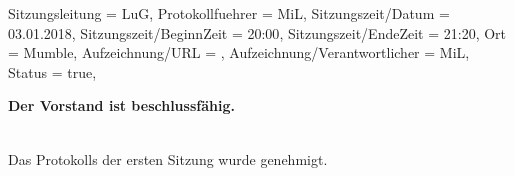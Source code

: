 
\begin{Protokoll}{
        Sitzungsleitung                 = {LuG},             %
        Protokollfuehrer                = {MiL},              %
        Sitzungszeit/Datum              = {03.01.2018},       %
        Sitzungszeit/BeginnZeit         = {20:00},            %
        Sitzungszeit/EndeZeit           = {21:20},            %
        Ort                             = {Mumble},            %
        Aufzeichnung/URL                = {},                %
        Aufzeichnung/Verantwortlicher   = {MiL},                  %
        Status                          = {true},            %
    }
    
    \begin{Anwesenheitsliste}
    \end{Anwesenheitsliste}
    
    \textbf{Der Vorstand ist beschlussfähig.}
    
     \\
    Das {Protokolls der ersten Sitzung} wurde genehmigt.
    
    

\end{Protokoll}
